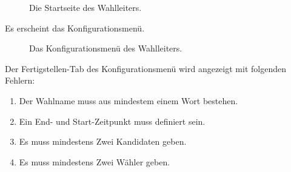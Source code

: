 \documentclass[parskip=full]{scrartcl}
\begin{document}
\begin{figure}[h!]
	\caption{\label{fig:sup_frontpage}
		Die Startseite des Wahlleiters.
	}
\end{figure}
		
		{Es erscheint das Konfigurationsmenü.}

\begin{figure}[h!]
	\caption{\label{fig:sup_configuration}
		Das Konfigurationsmenü des Wahlleiters.
	}
\end{figure}

		{Der Fertigstellen-Tab des Konfigurationsmenü wird angezeigt mit folgenden Fehlern:
		\begin{enumerate}
			\item Der Wahlname muss aus mindestem einem Wort bestehen.
			\item Ein End- und Start-Zeitpunkt muss definiert sein.
			\item Es muss mindestens Zwei Kandidaten geben.
			\item Es muss mindestens Zwei Wähler geben.
		\end{enumerate}}
\end{document}
